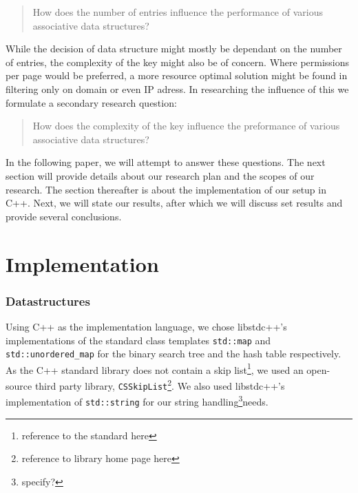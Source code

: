 \documentclass[12pt,a4paper]{article}
\begin{document}
    \begin{quotation}How does the number of entries influence the performance of various associative data structures?\end{quotation}
    
    While the decision of data structure might mostly be dependant on the number of entries, the complexity
    of the key might also be of concern. Where permissions per page would be preferred, a more
    resource optimal solution might be found in filtering only on domain or even IP adress.
    In researching the influence of this we formulate a secondary research question:
    
    \begin{quotation}How does the complexity of the key influence the preformance of various associative data structures?\end{quotation}
    
    In the following paper, we will attempt to answer these questions. The next section will provide details
    about our research plan and the scopes of our research. The section thereafter is about the implementation
    of our setup in C++. Next, we will state our results, after which we will discuss set results and provide
    several conclusions.    
    \section{Implementation}
    \subsubsection*{Datastructures}

    Using C++ as the implementation language, we chose libstdc++'s implementations of the standard class
    templates \texttt{std::map} and \texttt{std::unordered\_map} for the binary search
    tree and the hash table respectively.  As the C++ standard library does not contain a skip
    list\footnote{reference to the standard here}, we used an open-source third party library,
    \texttt{CSSkipList}\footnote{reference to library home page here}.  We also used libstdc++'s
    implementation of \texttt{std::string} for our string handling\footnote{specify?}needs.
    
\end{document}

